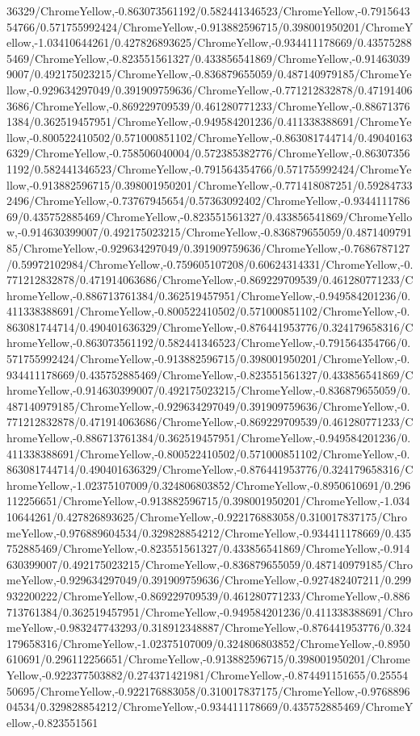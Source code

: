 {\begin{tikzternal}
{36329/ChromeYellow,-0.863073561192/0.582441346523/ChromeYellow,-0.791564354766/0.571755992424/ChromeYellow,-0.913882596715/0.398001950201/ChromeYellow,-1.03410644261/0.427826893625/ChromeYellow,-0.934411178669/0.435752885469/ChromeYellow,-0.823551561327/0.433856541869/ChromeYellow,-0.914630399007/0.492175023215/ChromeYellow,-0.836879655059/0.487140979185/ChromeYellow,-0.929634297049/0.391909759636/ChromeYellow,-0.771212832878/0.471914063686/ChromeYellow,-0.869229709539/0.461280771233/ChromeYellow,-0.886713761384/0.362519457951/ChromeYellow,-0.949584201236/0.411338388691/ChromeYellow,-0.800522410502/0.571000851102/ChromeYellow,-0.863081744714/0.490401636329/ChromeYellow,-0.758506040004/0.572385382776/ChromeYellow,-0.863073561192/0.582441346523/ChromeYellow,-0.791564354766/0.571755992424/ChromeYellow,-0.913882596715/0.398001950201/ChromeYellow,-0.771418087251/0.592847332496/ChromeYellow,-0.73767945654/0.57363092402/ChromeYellow,-0.934411178669/0.435752885469/ChromeYellow,-0.823551561327/0.433856541869/ChromeYellow,-0.914630399007/0.492175023215/ChromeYellow,-0.836879655059/0.487140979185/ChromeYellow,-0.929634297049/0.391909759636/ChromeYellow,-0.7686787127/0.59972102984/ChromeYellow,-0.759605107208/0.60624314331/ChromeYellow,-0.771212832878/0.471914063686/ChromeYellow,-0.869229709539/0.461280771233/ChromeYellow,-0.886713761384/0.362519457951/ChromeYellow,-0.949584201236/0.411338388691/ChromeYellow,-0.800522410502/0.571000851102/ChromeYellow,-0.863081744714/0.490401636329/ChromeYellow,-0.876441953776/0.324179658316/ChromeYellow,-0.863073561192/0.582441346523/ChromeYellow,-0.791564354766/0.571755992424/ChromeYellow,-0.913882596715/0.398001950201/ChromeYellow,-0.934411178669/0.435752885469/ChromeYellow,-0.823551561327/0.433856541869/ChromeYellow,-0.914630399007/0.492175023215/ChromeYellow,-0.836879655059/0.487140979185/ChromeYellow,-0.929634297049/0.391909759636/ChromeYellow,-0.771212832878/0.471914063686/ChromeYellow,-0.869229709539/0.461280771233/ChromeYellow,-0.886713761384/0.362519457951/ChromeYellow,-0.949584201236/0.411338388691/ChromeYellow,-0.800522410502/0.571000851102/ChromeYellow,-0.863081744714/0.490401636329/ChromeYellow,-0.876441953776/0.324179658316/ChromeYellow,-1.02375107009/0.324806803852/ChromeYellow,-0.8950610691/0.296112256651/ChromeYellow,-0.913882596715/0.398001950201/ChromeYellow,-1.03410644261/0.427826893625/ChromeYellow,-0.922176883058/0.310017837175/ChromeYellow,-0.976889604534/0.329828854212/ChromeYellow,-0.934411178669/0.435752885469/ChromeYellow,-0.823551561327/0.433856541869/ChromeYellow,-0.914630399007/0.492175023215/ChromeYellow,-0.836879655059/0.487140979185/ChromeYellow,-0.929634297049/0.391909759636/ChromeYellow,-0.927482407211/0.299932200222/ChromeYellow,-0.869229709539/0.461280771233/ChromeYellow,-0.886713761384/0.362519457951/ChromeYellow,-0.949584201236/0.411338388691/ChromeYellow,-0.983247743293/0.318912348887/ChromeYellow,-0.876441953776/0.324179658316/ChromeYellow,-1.02375107009/0.324806803852/ChromeYellow,-0.8950610691/0.296112256651/ChromeYellow,-0.913882596715/0.398001950201/ChromeYellow,-0.922377503882/0.274371421981/ChromeYellow,-0.874491151655/0.2555450695/ChromeYellow,-0.922176883058/0.310017837175/ChromeYellow,-0.976889604534/0.329828854212/ChromeYellow,-0.934411178669/0.435752885469/ChromeYellow,-0.823551561}
\end{tikzternal}}
